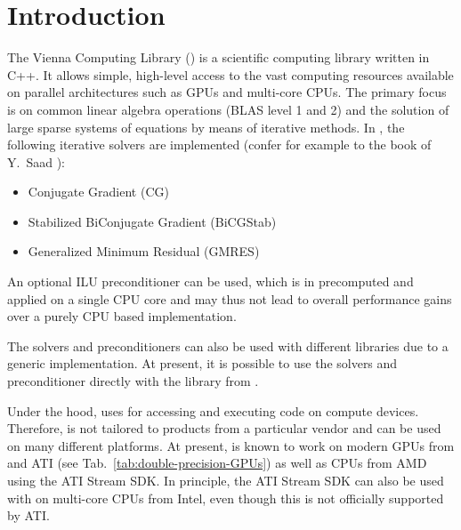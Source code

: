 
\chapter*{Introduction}   

The Vienna Computing Library (\ViennaCL) is a scientific computing
library written in C++. It allows simple, high-level access
to the vast computing resources available on parallel architectures such as
GPUs and multi-core CPUs. The primary focus is on common linear algebra
operations (BLAS level 1
and 2) and the solution of large sparse systems of equations by means of iterative
methods. In {\ViennaCLminorversion}, the following iterative solvers are
implemented (confer for example to the book of Y.~Saad
\cite{saad-iterative-solution}):
\begin{itemize}
 \item Conjugate Gradient (CG)
 \item Stabilized BiConjugate Gradient (BiCGStab)
 \item Generalized Minimum Residual (GMRES)
\end{itemize}
An optional ILU preconditioner can be used, which is in {\ViennaCLversion}
precomputed and applied on a single CPU core and may thus not lead to overall
performance gains over a purely CPU based implementation.

The solvers and preconditioners can also be used with different
libraries due to a generic implementation. At present, it is possible to
use the solvers and preconditioner directly with the {\ublas} library from
{\Boost} \cite{boost}.

Under the hood, {\ViennaCL} uses {\OpenCL} \cite{khronoscl} for accessing and
executing code on compute devices. Therefore, {\ViennaCL} is not tailored 
to products from a particular vendor and can be used on many different
platforms. At present, {\ViennaCL} is known to work on modern GPUs from \NVIDIA
and ATI (see Tab.~\ref{tab:double-precision-GPUs}) as well as CPUs from AMD
using the ATI Stream SDK. In principle, the ATI Stream SDK can also be used with
{\ViennaCL} on multi-core CPUs from Intel, even though this is not officially
supported by ATI.



